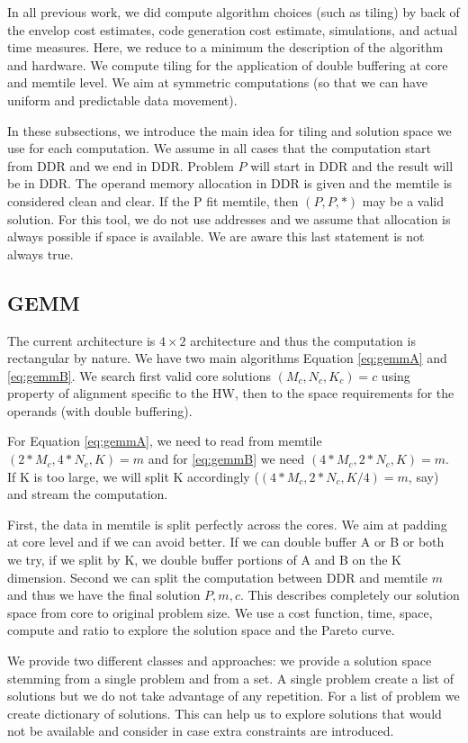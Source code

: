 \documentclass[conference]{IEEEtran}
\begin{document}
In all previous work, we did compute algorithm choices (such as
tiling) by back of the envelop cost estimates, code generation cost
estimate, simulations, and actual time measures. Here, we reduce to a
minimum the description of the algorithm and hardware. We compute
tiling for the application of double buffering at core and memtile
level. We aim at symmetric computations (so that we can have uniform
and predictable data movement).

In these subsections, we introduce the main idea for tiling and
solution space we use for each computation. We assume in all cases
that the computation start from DDR and we end in DDR. Problem $P$
will start in DDR and the result will be in DDR. The operand memory
allocation in DDR is given and the memtile is considered clean and
clear. If the P fit memtile, then $(P,P,*)$ may be a valid
solution. For this tool, we do not use addresses and we assume that
allocation is always possible if space is available. We are aware this
last statement is not always true.

\subsection{GEMM}
The current architecture is $4\times 2$ architecture and thus the
computation is rectangular by nature. We have two main algorithms
Equation \ref{eq:gemmA} and \ref{eq:gemmB}. We search first valid core
solutions $(M_c,N_c,K_c)=c$ using property of alignment specific to
the HW, then to the space requirements for the operands (with double
buffering).

For Equation \ref{eq:gemmA}, we need to read from memtile
$(2*M_c,4*N_c,K)=m$ and for \ref{eq:gemmB} we need
$(4*M_c,2*N_c,K)=m$. If K is too large, we will split K accordingly
($(4*M_c,2*N_c,K/4)=m$, say) and stream the computation.

First, the data in memtile is split perfectly across the cores. We aim
at padding at core level and if we can avoid better.  If we can double
buffer A or B or both we try, if we split by K, we double buffer
portions of A and B on the K dimension. Second we can split the
computation between DDR and memtile $m$ and thus we have the final
solution $P,m,c$. This describes completely our solution space from
core to original problem size.  We use a cost function, time, space,
compute and ratio to explore the solution space and the Pareto curve.

We provide two different classes and approaches: we provide a solution
space stemming from a single problem and from a set. A single problem
create a list of solutions but we do not take advantage of any
repetition. For a list of problem we create dictionary of
solutions. This can help us to explore solutions that would not be
available and consider in case extra constraints are introduced.
\end{document}
